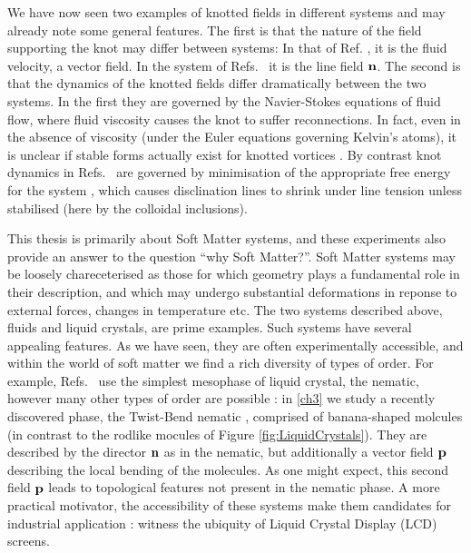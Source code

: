 We have now seen two examples of knotted fields in different systems and may already note some general features. The first is that the nature of the field supporting the knot may differ between systems: In that of Ref. \cite{Klecker2013}, it is the fluid velocity, a vector field. In the system of Refs.~\cite{Tkalec2011,Tasinkevych2014,Copar2015} it is the line field $\bf n$. The second is that the dynamics of the knotted fields differ dramatically between the two systems. In the first they are governed by the Navier-Stokes equations of fluid flow, where fluid viscosity causes the knot to suffer reconnections. In fact, even in the absence of viscosity (under the  Euler equations governing Kelvin's atoms), it is unclear if stable forms actually exist for knotted vortices \cite{Kida}. By contrast knot dynamics in Refs.~\cite{Tkalec2011,Tasinkevych2014,Copar2015} are governed by minimisation of the appropriate free energy for the system \cite{DeGennes, Frank}, which causes disclination lines to shrink under line tension unless stabilised (here by the colloidal inclusions). 

This thesis is primarily about Soft Matter systems, and these experiments also provide an answer to the question ``why Soft Matter?''. Soft Matter systems may be loosely chareceterised as those for which geometry plays a fundamental role in their description, and which may undergo substantial deformations in reponse to external forces, changes in temperature etc. The two systems described above, fluids and liquid crystals, are prime examples. Such systems have several appealing features. As we have seen, they are often experimentally accessible, and within the world of soft matter we find a rich diversity of types of order. For example, Refs.~\cite{Tkalec2011,Tasinkevych2014,Copar2015} use the simplest mesophase of liquid crystal, the nematic, however many other types of order are possible \cite{DeGennes}: in \ref{ch3} we study a recently discovered phase, the Twist-Bend nematic \cite{Lavrentovich}, comprised of banana-shaped molcules (in contrast to the rodlike mocules of Figure \ref{fig:LiquidCrystals}). They are described by the director $\bf n$ as in the nematic, but additionally a vector field $\bf p$ describing the local bending of the molecules. As one might expect, this second field $\bf p$ leads to topological features not present in the nematic phase. A more practical motivator, the accessibility of these systems make them candidates for industrial application \cite{Musevic}: witness the ubiquity of Liquid Crystal Display (LCD) screens.

